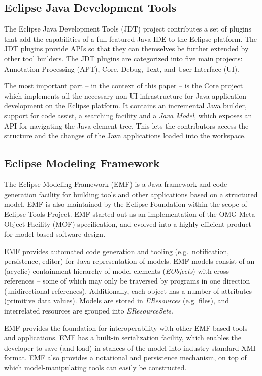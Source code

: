 \subsection{Eclipse Java Development Tools~\cite{JDT}}
The Eclipse Java Development Tools (JDT) project contributes a set of
plugins that add the capabilities of a full-featured Java IDE to the Eclipse
platform. The JDT plugins provide APIs so that they can themselves be further
extended by other tool builders. The JDT plugins are categorized into five main
projects: Annotation Processing (APT), Core, Debug, Text, and User Interface
(UI).

The most important part -- in the context of this paper -- is the Core project
which implements all the necessary non-UI infrastructure for Java application
development on the Eclipse platform. It contains an incremental Java builder,
support for code assist, a searching facility and a \emph{Java Model}, which
exposes an API for navigating the Java element tree. This lets the contributors
access the structure and the changes of the Java applications loaded into the
workspace.

\subsection{Eclipse Modeling Framework~\cite{EMF}}
The Eclipse Modeling Framework (EMF) is a Java framework and code
generation facility for building tools and other applications based on a
structured model. EMF is also maintained by the Eclipse Foundation within the
scope of Eclipse Tools Project. EMF started out as an implementation of the OMG
Meta Object Facility (MOF) specification, and evolved into a highly efficient
product for model-based software design.

EMF provides automated code generation and tooling (e.g.~notification,
persistence, editor) for Java representation of models. EMF models consist of an
(acyclic) containment hierarchy of model elements (\emph{EObjects}) with
cross-references -- some of which may only be traversed by programs in one
direction (unidirectional references). Additionally, each object has a number of
attributes (primitive data values). Models are stored in \emph{EResources} (e.g.
files), and interrelated resources are grouped into \emph{EResourceSets}.

EMF provides the foundation for interoperability with other EMF-based tools and
applications. EMF has a built-in serialization facility, which enables the developer to save
(and load) in-stances of the model into industry-standard XMI format. EMF also
provides a notational and persistence mechanism, on top of which
model-manipulating tools can easily be constructed.

